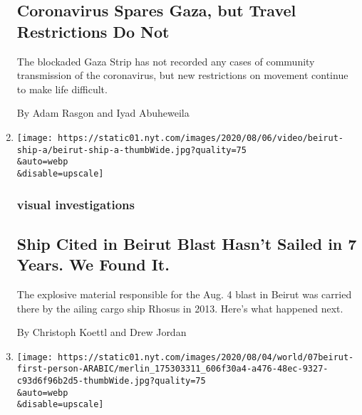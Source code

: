 \begin{enumerate}
  \hypertarget{coronavirus-spares-gaza-but-travel-restrictions-do-not}{%
  \subsection{Coronavirus Spares Gaza, but Travel Restrictions Do
  Not}\label{coronavirus-spares-gaza-but-travel-restrictions-do-not}}

  The blockaded Gaza Strip has not recorded any cases of community
  transmission of the coronavirus, but new restrictions on movement
  continue to make life difficult.

  By Adam Rasgon and Iyad Abuheweila
\item
  \href{/2020/08/07/world/middleeast/lebanon-explosion-ship.html}{}

  \texttt{[image: https://static01.nyt.com/images/2020/08/06/video/beirut-ship-a/beirut-ship-a-thumbWide.jpg?quality=75\\\&auto=webp\\\&disable=upscale]}

  \hypertarget{visual-investigations}{%
  \subsubsection{visual investigations}\label{visual-investigations}}

  \hypertarget{ship-cited-in-beirut-blast-hasnt-sailed-in-7-years-we-found-it}{%
  \subsection{Ship Cited in Beirut Blast Hasn't Sailed in 7 Years. We
  Found
  It.}\label{ship-cited-in-beirut-blast-hasnt-sailed-in-7-years-we-found-it}}

  The explosive material responsible for the Aug. 4 blast in Beirut was
  carried there by the ailing cargo ship Rhosus in 2013. Here's what
  happened next.

  By Christoph Koettl and Drew Jordan
\item
  \href{/ar/2020/08/07/world/middleeast/beirut-explosion-journalist.html}{}

  \texttt{[image: https://static01.nyt.com/images/2020/08/04/world/07beirut-first-person-ARABIC/merlin\_175303311\_606f30a4-a476-48ec-9327-c93d6f96b2d5-thumbWide.jpg?quality=75\\\&auto=webp\\\&disable=upscale]}

  \hypertarget{ux643ux646ux62a-ux645ux636ux631ux62cux629-ux628ux62fux645ux627ux626ux64a-ux648ux645ux630ux647ux648ux644ux629-ux623ux646ux627ux633-ux63aux631ux628ux627ux621-ux641ux64a-ux628ux64aux631ux648ux62a-ux639ux627ux645ux644ux648ux646ux64a-ux643ux623ux646ux646ux64a-ux635ux62fux64aux642ux629}{%
}
\end{enumerate}
